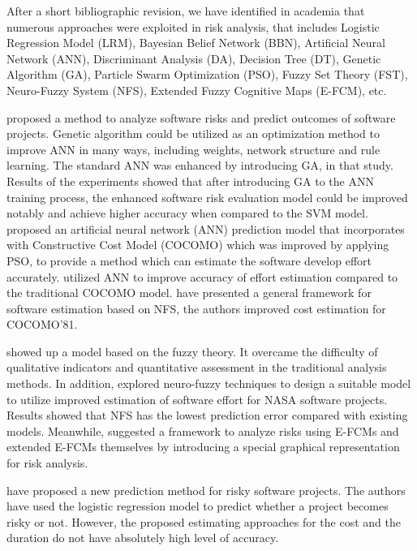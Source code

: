 \documentclass[a4paper,twoside]{article}
\begin{document}
\noindent After a short bibliographic revision, we have identified in academia that numerous approaches were exploited in risk analysis, that includes Logistic Regression Model (LRM), Bayesian Belief Network (BBN), Artificial Neural Network (ANN), Discriminant Analysis (DA), Decision Tree (DT), Genetic Algorithm (GA), Particle Swarm Optimization (PSO), Fuzzy Set Theory (FST), Neuro-Fuzzy System (NFS), Extended Fuzzy Cognitive Maps (E-FCM), etc.

\cite{hu2007software} proposed a method to analyze software risks and predict outcomes of software projects. Genetic algorithm could be utilized as an optimization method to improve ANN in many ways, including weights, network structure and rule learning. The standard ANN was enhanced by introducing GA, in that study. Results of the experiments showed that after introducing GA to the ANN training process, the enhanced software risk evaluation model could be improved notably and achieve higher accuracy when compared to the SVM model. \cite{dan2013improving} proposed an artificial neural network (ANN) prediction model that incorporates with Constructive Cost Model (COCOMO) which was improved by applying PSO, to provide a method which can estimate the software develop effort accurately. \cite{attarzadeh2010novel} utilized ANN to improve accuracy of effort estimation compared to the traditional COCOMO model. \cite{huang2004neuro} have presented a general framework for software estimation based on NFS, the authors improved cost estimation for COCOMO'81.

\cite{yu2011software} showed up a model based on the fuzzy theory. It overcame the difficulty of qualitative indicators and quantitative assessment in the traditional analysis methods. In addition, \cite{saxena2012software} explored neuro-fuzzy techniques to design a suitable model to utilize improved estimation of software effort for NASA software projects. Results showed that NFS has the lowest prediction error compared with existing models. Meanwhile, \cite{lazzerini2011analyzing} suggested a framework to analyze risks using E-FCMs and extended E-FCMs themselves by introducing a special graphical representation for risk analysis.

\cite{mizuno2001prediction} have proposed a new prediction method for risky software projects. The authors have used the logistic regression model to predict whether a project becomes risky or not. However, the proposed estimating approaches for the cost and the duration do not have absolutely high level of accuracy.
\end{document}
